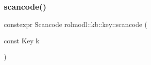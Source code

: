 \mbox{\label{namespacerolmodl_1_1kb_1_1key_a0c5dea49f4ae2ad1371b4c47e3afd8fb}} 
\subsubsection{\texorpdfstring{scancode()}{scancode()}}
{\footnotesize\ttfamily constexpr Scancode rolmodl\+::kb\+::key\+::scancode (\begin{DoxyParamCaption}\item[{const Key}]{k }\end{DoxyParamCaption})\hspace{0.3cm}{\ttfamily [noexcept]}}

